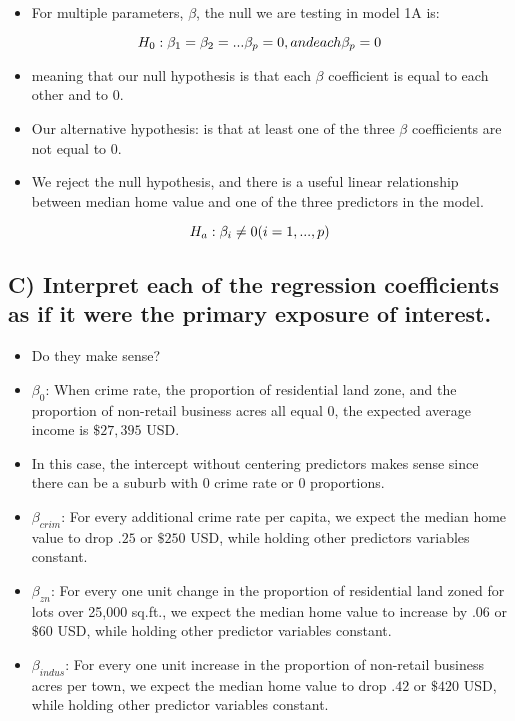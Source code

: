 \documentclass[
  letterpaper,
  DIV=11,
  numbers=noendperiod]{scrartcl}
\providecommand{\tightlist}{%
  \setlength{\itemsep}{0pt}\setlength{\parskip}{0pt}}\usepackage{longtable,booktabs,array}
\begin{document}
\begin{itemize}
\tightlist
\item
  For multiple parameters, \(\beta\), the null we are testing in model
  1A is:
\end{itemize}

\[
H_0 : \beta_1 = \beta_2 = ... \beta_p = 0, \space \\
and \space each \space \beta_p = 0 
\]

\begin{itemize}
\item
  meaning that our null hypothesis is that each \(\beta\) coefficient is
  equal to each other and to \(0\).
\item
  Our alternative hypothesis: is that at least one of the three
  \(\beta\) coefficients are not equal to \(0\).
\item
  We reject the null hypothesis, and there is a useful linear
  relationship between median home value and one of the three predictors
  in the model.
\end{itemize}

\[
H_a : \beta_i \ne 0 \space (i = 1,...,p)
\]

\subsection{C) Interpret each of the regression coefficients as if it
were the primary exposure of
interest.}\label{c-interpret-each-of-the-regression-coefficients-as-if-it-were-the-primary-exposure-of-interest.}

\begin{itemize}
\item
  Do they make sense?
\item
  \(\beta_0\): When crime rate, the proportion of residential land zone,
  and the proportion of non-retail business acres all equal \(0\), the
  expected average income is \(\$27,395\) USD.
\item
  In this case, the intercept without centering predictors makes sense
  since there can be a suburb with 0 crime rate or 0 proportions.
\item
  \(\beta_{crim}\): For every additional crime rate per capita, we
  expect the median home value to drop \(.25\) or \(\$250\) USD, while
  holding other predictors variables constant.
\item
  \(\beta_{zn}\): For every one unit change in the proportion of
  residential land zoned for lots over 25,000 sq.ft., we expect the
  median home value to increase by \(.06\) or \(\$60\) USD, while
  holding other predictor variables constant.
\item
  \(\beta_{indus}\): For every one unit increase in the proportion of
  non-retail business acres per town, we expect the median home value to
  drop \(.42\) or \(\$420\) USD, while holding other predictor variables
  constant.
\end{itemize}
\end{document}
